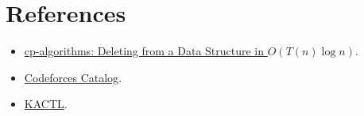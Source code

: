 \section*{References}

\begin{itemize}
  \item \href{https://cp-algorithms.com/data_structures/deleting_in_log_n.html}{cp-algorithms: Deleting from a Data Structure in \(O(T(n)\log n)\)}.
  \item \href{https://codeforces.com/catalog?locale=en}{Codeforces Catalog}.
  \item \href{https://github.com/kth-competitive-programming/kactl}{KACTL}.
\end{itemize}
